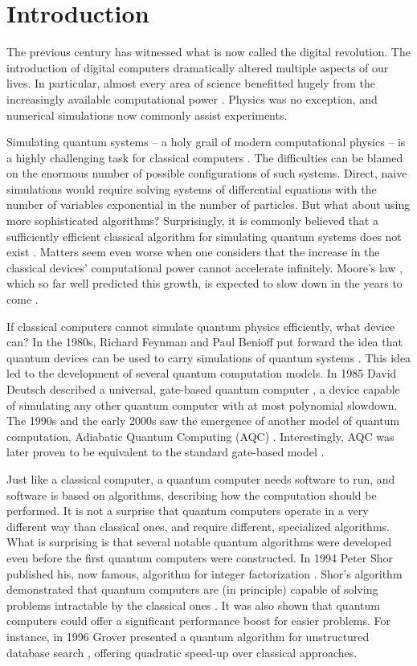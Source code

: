\chapter{Introduction}
The previous century has witnessed what is now called the digital revolution.
The introduction of digital computers dramatically altered multiple aspects of
our lives. In particular, almost every area of science benefitted hugely from
the increasingly available computational power \cite{winsberg}. Physics was no
exception, and numerical simulations now commonly assist experiments.

Simulating quantum systems -- a holy grail of modern computational physics --
is a highly challenging task for classical computers \cite{feynman.82}. The
difficulties can be blamed on the enormous number of possible configurations of
such systems. Direct, naive simulations would require solving systems of
differential equations with the number of variables exponential in the number
of particles. But what about using more sophisticated algorithms? Surprisingly,
it is commonly believed that a sufficiently efficient classical algorithm for
simulating quantum systems does not exist \cite{feynman.82, poplavskii}.
Matters seem even worse when one considers that the increase in the classical
devices' computational power cannot accelerate infinitely. Moore's law
\cite{mack}, which so far well predicted this growth, is expected to slow down
in the years to come \cite{waldrop, kumar}.

If classical computers cannot simulate quantum physics efficiently, what device
can? In the 1980s, Richard Feynman and Paul Benioff put forward the idea that
quantum devices can be used to carry simulations of quantum systems
\cite{feynman.82,benioff.80}. This idea led to the development of several
quantum computation models. In 1985 David Deutsch described a universal,
gate-based quantum computer \cite{deutsch}, a device capable of simulating any
other quantum computer with at most polynomial slowdown. The 1990s and the
early 2000s saw the emergence of another model of quantum computation,
Adiabatic Quantum Computing (AQC) \cite{kadowaki,farhi}. Interestingly, AQC was
later proven to be equivalent to the standard gate-based model \cite{aharonov}.

Just like a classical computer, a quantum computer needs software to run, and
software is based on algorithms, describing how the computation should be
performed. It is not a surprise that quantum computers operate in a very
different way than classical ones, and require different, specialized
algorithms. What is surprising is that several notable quantum algorithms were
developed even before the first quantum computers were constructed. In 1994
Peter Shor published his, now famous, algorithm for integer factorization
\cite{shor}. Shor's algorithm demonstrated that quantum computers are (in
principle) capable of solving problems intractable by the classical ones
\cite{kleinjung}. It was also shown that quantum computers could offer a
significant performance boost for easier problems. For instance, in 1996 Grover
presented a quantum algorithm for unstructured database search \cite{grover},
offering quadratic speed-up over classical approaches.

